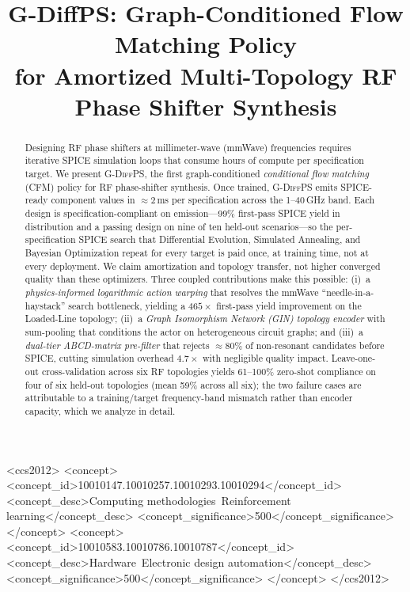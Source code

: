 \documentclass[sigconf,anonymous,review]{acmart}
\newcommand{\gdiffps}{\textsc{G-DiffPS}}
\begin{document}
\title{G-DiffPS: Graph-Conditioned Flow Matching Policy\\
       for Amortized Multi-Topology RF Phase Shifter Synthesis}


\begin{abstract}
Designing RF phase shifters at millimeter-wave (mmWave) frequencies requires
iterative SPICE simulation loops that consume hours of compute per specification
target. We present \gdiffps{}, the first graph-conditioned \emph{conditional
flow matching} (CFM) policy for RF phase-shifter synthesis. Once trained,
\gdiffps{} emits SPICE-ready component values in ${\approx}2$\,ms per
specification across the 1--40\,GHz band.  Each design is specification-compliant
on emission---99\% first-pass SPICE yield in distribution and a passing design
on nine of ten held-out scenarios---so the per-specification SPICE search that
Differential Evolution, Simulated Annealing, and Bayesian Optimization repeat
for every target is paid once, at training time, not at every deployment.  We
claim amortization and topology transfer, not higher converged quality than
these optimizers.
Three coupled contributions make this possible:
(i)~a \emph{physics-informed logarithmic action warping} that resolves the
mmWave ``needle-in-a-haystack'' search bottleneck, yielding a
$465{\times}$ first-pass yield improvement on the Loaded-Line topology;
(ii)~a \emph{Graph Isomorphism Network (GIN) topology encoder} with
sum-pooling that conditions the actor on heterogeneous circuit graphs; and
(iii)~a \emph{dual-tier ABCD-matrix pre-filter} that rejects ${\approx}80\%$
of non-resonant candidates before SPICE, cutting simulation overhead
$4.7{\times}$ with negligible quality impact.
Leave-one-out cross-validation across six RF topologies yields
61--100\% zero-shot compliance on four of six held-out topologies
(mean 59\% across all six); the two failure cases are attributable
to a training/target frequency-band mismatch rather than encoder capacity,
which we analyze in detail.
\end{abstract}

\begin{CCSXML}
<ccs2012>
  <concept>
    <concept_id>10010147.10010257.10010293.10010294</concept_id>
    <concept_desc>Computing methodologies~Reinforcement learning</concept_desc>
    <concept_significance>500</concept_significance>
  </concept>
  <concept>
    <concept_id>10010583.10010786.10010787</concept_id>
    <concept_desc>Hardware~Electronic design automation</concept_desc>
    <concept_significance>500</concept_significance>
  </concept>
</ccs2012>
\end{CCSXML}
\end{document}
